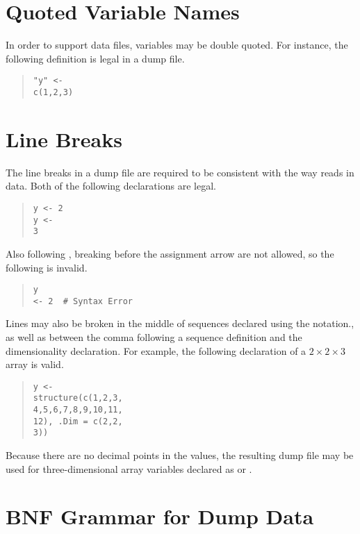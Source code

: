 \section{Quoted Variable Names}

In order to support \JAGS data files, variables may be double quoted.
For instance, the following definition is legal in a dump file.
%
\begin{quote}
\begin{Verbatim}[fontsize=\small]
"y" <-
c(1,2,3)
\end{Verbatim}
\end{quote}

\section{Line Breaks}

The line breaks in a dump file are required to be consistent with
the way \R reads in data.  Both of the following declarations are
legal.
%
\begin{quote}
\begin{Verbatim}[fontsize=\small]
y <- 2
y <-
3
\end{Verbatim}
\end{quote}
%
Also following \R, breaking before the assignment arrow are not
allowed, so the following is invalid.
%
\begin{quote}
\begin{Verbatim}[fontsize=\small]
y
<- 2  # Syntax Error
\end{Verbatim}
\end{quote}

Lines may also be broken in the middle of sequences declared
using the  notation., as well as between the comma
following a sequence definition and the dimensionality declaration.
For example, the following declaration of a $2 \times 2 \times 3$
array is valid.
%
\begin{quote}
\begin{Verbatim}[fontsize=\small]
y <-
structure(c(1,2,3,
4,5,6,7,8,9,10,11,
12), .Dim = c(2,2,
3))
\end{Verbatim}
\end{quote}
%
Because there are no decimal points in the values, the resulting dump
file may be used for three-dimensional array variables declared as
 or .

\section{BNF Grammar for Dump Data}

